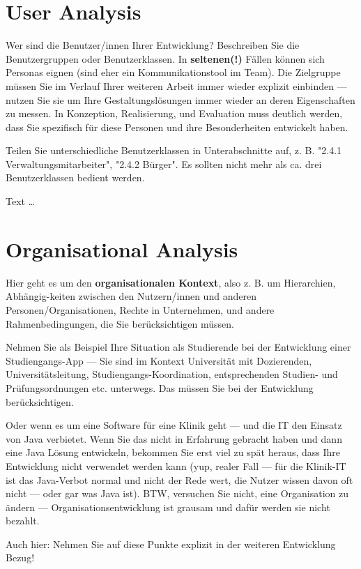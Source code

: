 \documentclass[11pt,a4paper,english]{scrreprt}
\newenvironment{comment}
  {\par\medskip
   \begingroup\color{olive}%
   }
 {\endgroup
  \medskip}
\begin{document}
\section{User Analysis}
\begin{comment}
Wer sind die Benutzer/innen Ihrer Entwicklung? Beschreiben Sie die Benutzergruppen oder Benutzerklassen. In \textbf{seltenen(!)} Fällen können sich Personas eignen (sind eher ein Kommunikationstool im Team). Die Zielgruppe müssen Sie im Verlauf Ihrer weiteren Arbeit immer wieder explizit einbinden — nutzen Sie sie um Ihre Gestaltungslösungen immer wieder an deren Eigenschaften zu messen. In Konzeption, Realisierung, und Evaluation muss deutlich werden, dass Sie spezifisch für diese Personen und ihre Besonderheiten entwickelt haben.

Teilen Sie unterschiedliche Benutzerklassen in Unterabschnitte auf, z. B. "2.4.1 Verwaltungsmitarbeiter", "2.4.2 Bürger". Es sollten nicht mehr als ca. drei Benutzerklassen bedient werden.
\end{comment}

Text \dots

\section{Organisational Analysis}
\begin{comment}
Hier geht es um den \textbf{organisationalen Kontext}, also z. B. um Hierarchien, Abhängig-keiten zwischen den Nutzern/innen und anderen Personen/Organisationen, Rechte in Unternehmen, und andere Rahmenbedingungen, die Sie berücksichtigen müssen.

Nehmen Sie als Beispiel Ihre Situation als Studierende bei der Entwicklung einer Studiengangs-App — Sie sind im Kontext Universität mit Dozierenden, Universitätsleitung, Studiengangs-Koordination, entsprechenden Studien- und Prüfungsordnungen etc. unterwegs. Das müssen Sie bei der Entwicklung berücksichtigen.

Oder wenn es um eine Software für eine Klinik geht — und die IT den Einsatz von Java verbietet. Wenn Sie das nicht in Erfahrung gebracht haben und dann eine Java Lösung entwickeln, bekommen Sie erst viel zu spät heraus, dass Ihre Entwicklung nicht verwendet werden kann (yup, realer Fall — für die Klinik-IT ist das Java-Verbot normal und nicht der Rede wert, die Nutzer wissen davon oft nicht — oder gar was Java ist). BTW, versuchen Sie nicht, eine Organisation zu ändern — Organisationsentwicklung ist grausam und dafür werden sie nicht bezahlt.

Auch hier: Nehmen Sie auf diese Punkte explizit in der weiteren Entwicklung Bezug!
\end{comment}
\end{document}
